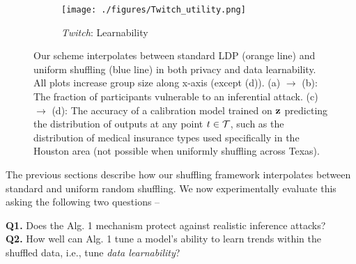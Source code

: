 \begin{figure*}[ht]
    \begin{subfigure}[b]{0.25\linewidth}
        \centering
        \texttt{[image: ./figures/Twitch\_utility.png]}
        \caption{\textit{Twitch}: Learnability}
        \label{fig:Twitch:utility}
    \end{subfigure}
    \vspace{-0.2cm}
   \caption[Our scheme interpolates between standard LDP (orange line) and uniform shuffling (blue line) in both privacy and data learnability.]{
   Our scheme interpolates between standard LDP (orange line) and uniform shuffling (blue line) in both privacy and data learnability. All plots increase group size along x-axis (except (d)). 
   (a) $\rightarrow$ (b): The fraction of participants vulnerable to an inferential attack.  
   (c) $\rightarrow$ (d): The accuracy of a calibration model trained on $\mathbf{z}$ predicting the distribution of \ldp outputs at any point $t \in \mathcal{T}$, such as the distribution of medical insurance types used specifically in the Houston area (not possible when uniformly shuffling across Texas). 
   }
   \label{fig:results}
   \vspace{-0.3cm}
\end{figure*}


The previous sections describe how our shuffling framework interpolates between standard \ldp and uniform random shuffling. We now experimentally evaluate this asking the following two questions -- 

\textbf{Q1.} Does the Alg. 1 mechanism protect against realistic inference attacks? \\\textbf{Q2.} How well can Alg. 1 tune a model's ability to learn trends within the shuffled data, i.e., tune \emph{data learnability}?

